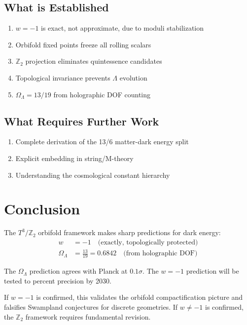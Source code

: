 \documentclass[12pt,a4paper]{article}
\begin{document}
\subsection{What is Established}

\begin{enumerate}
    \item $w = -1$ is exact, not approximate, due to moduli stabilization
    \item Orbifold fixed points freeze all rolling scalars
    \item $\mathbb{Z}_2$ projection eliminates quintessence candidates
    \item Topological invariance prevents $\Lambda$ evolution
    \item $\Omega_\Lambda = 13/19$ from holographic DOF counting
\end{enumerate}

\subsection{What Requires Further Work}

\begin{enumerate}
    \item Complete derivation of the 13/6 matter-dark energy split
    \item Explicit embedding in string/M-theory
    \item Understanding the cosmological constant hierarchy
\end{enumerate}

\section{Conclusion}

The $T^3/\mathbb{Z}_2$ orbifold framework makes sharp predictions for dark energy:
\begin{align}
w &= -1 \quad \text{(exactly, topologically protected)} \\
\Omega_\Lambda &= \frac{13}{19} = 0.6842 \quad \text{(from holographic DOF)}
\end{align}

The $\Omega_\Lambda$ prediction agrees with Planck at $0.1\sigma$. The $w = -1$ prediction will be tested to percent precision by 2030.

If $w = -1$ is confirmed, this validates the orbifold compactification picture and falsifies Swampland conjectures for discrete geometries. If $w \neq -1$ is confirmed, the $\mathbb{Z}_2$ framework requires fundamental revision.
\end{document}
